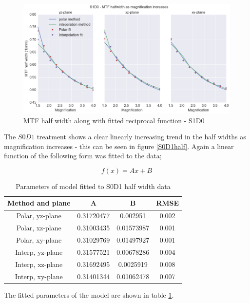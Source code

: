 \documentclass[
  twoside,
  11pt, a4paper,
  footinclude=true,
  headinclude=true,
  cleardoublepage=empty
]{scrbook}
\begin{document}
\begin{figure}[h!]
  \centering
    \includegraphics[width=\textwidth]{code/MTF_and_PSF/MTF_Interp_Polar_Plots_files/MTF_Interp_Polar_Plots_8_0.png}
    \caption{MTF half width along with fitted reciprocal function - S1D0}
        \label{S1D0half}
\end{figure}

The $S0D1$ treatment shows a clear linearly increasing trend in the half widths as magnification increases - this can be seen in figure \ref{S0D1half}. Again a linear function of the following form was fitted to the data;

\[
f(x) = Ax + B
\]


\begin{table}
\caption{Parameters of model fitted to S0D1 half width data}
\label{linhalffit}
\begin{tabular}{c|ccc}
\toprule
{} Method and plane &     A &     B &  RMSE\\
\midrule
Polar, yz-plane         &  0.31720477 & 0.002951    & 0.002\\
Polar, xz-plane        &  0.31003435 & 0.01573987 &  0.001\\
Polar, xy-plane      &  0.31029769 & 0.01497927 &  0.001\\
Interp, yz-plane       &  0.31577521 & 0.00678286 &  0.004\\
Interp, xz-plane       &  0.31692495 & 0.0025919 &  0.008\\
Interp, xy-plane       &  0.31401344 & 0.01062478 &  0.007\\
\bottomrule
\end{tabular}
\end{table}

The fitted parameters of the model are shown in table \ref{linhalffit}.
\end{document}
